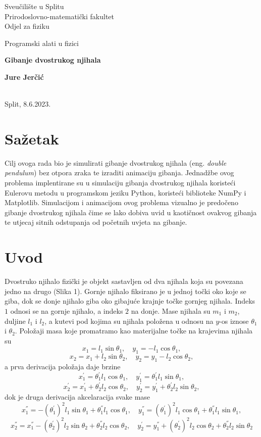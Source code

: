 \documentclass[a4paper,12pt]{article}
\begin{document}
\begin{center}
Sveučilište u Splitu\\
Prirodoslovno-matematički fakultet \\
Odjel za f\mbox{}iziku

\bigskip
\bigskip

\large{Programski alati u fizici}


\bigskip
\bigskip

\textbf{{\Large{Gibanje dvostrukog njihala}}}           
\end{center}
\begin{center}
\textbf{Jure Jerčić}\\
\
\end{center}
\begin{center}
Split, 8.6.2023.                                           
\end{center}

\section*{Sažetak}
Cilj ovoga rada bio je simulirati gibanje dvostrukog njihala (eng. \textit{double pendulum}) bez otpora zraka te izraditi animaciju gibanja. Jednadžbe ovog problema implentirane su u simulaciju gibanja dvostrukog njihala koristeći Eulerovu metodu u programskom jeziku Python, koristeći biblioteke NumPy i Matplotlib. Simulacijom i animacijom ovog problema vizualno je predočeno gibanje dvostrukog njihala čime se lako dobiva uvid u kaotičnost ovakvog gibanja te utjecaj sitnih odstupanja od početnih uvjeta na gibanje.


\section{Uvod}

Dvostruko njihalo fizički je objekt sastavljen od dva njihala koja su povezana jedno na drugo (Slika 1). Gornje njihalo fiksirano je u jednoj točki oko koje se giba, dok se donje njihalo giba oko gibajuće krajnje točke gornjeg njihala. Indeks $1$ odnosi se na gornje njihalo, a indeks $2$ na donje. Mase njihala su $m_1$ i $m_2$, duljine $l_1$ i $l_2$, a kutevi pod kojima su njihala položena u odnosu na $y$-os  iznose $\theta_1$ i $\theta_2$. Položaji masa koje promatramo kao materijalne točke na krajevima njihala su
$$x_1=l_1 \sin\theta_1, \quad y_1=-l_1\cos\theta_1,$$
$$x_2=x_1+l_2 \sin\theta_2, \quad y_2=y_1-l_2\cos\theta_2,$$ a prva derivacija položaja daje brzine
$$x_1^{'}=\theta_1^{'} l_1 \cos\theta_1, \quad y_1^{'}=\theta_1^{'}l_1\sin\theta_1,$$
$$x_2^{'}=x_1^{'}+\theta_2^{'}l_2 \cos\theta_2, \quad y_2^{'}=y_1^{'}+\theta_2^{'}l_2 \sin\theta_2,$$ dok je druga derivacija akcelaracija svake mase
$$x_1^{''}=-(\theta_1^{'})^{2} l_1 \sin\theta_1 + \theta_1^{''} l_1 \cos\theta_1, \quad y_1^{''}=(\theta_1^{'})^{2} l_1 \cos\theta_1 + \theta_1^{''} l_1 \sin\theta_1,$$
$$x_2^{''}=x_1^{''}-(\theta_2^{'})^{2} l_2 \sin\theta_2 + \theta_2^{''} l_2 \cos\theta_2, \quad y_2^{'}=y_1^{''}+(\theta_2^{'})^{2} l_2 \cos\theta_2 + \theta_2^{''} l_2 \sin\theta_2$$
\end{document}
